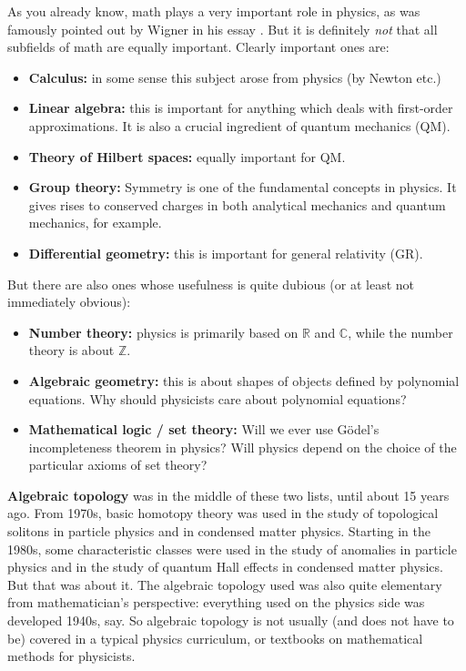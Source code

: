 \documentclass[12pt]{article}
\numberwithin{equation}{section}
\theoremstyle{remark}
\def\bC{\mathbb{C}}
\def\bR{\mathbb{R}}
\def\bZ{\mathbb{Z}}
\begin{document}
As you already know, math plays a very important role in physics, 
as was famously pointed out by Wigner in his essay \cite{WignerUnreasonable}.
But it is definitely \emph{not} that all subfields of math are equally important.
Clearly important ones are:
\begin{itemize}
  \item \textbf{Calculus:} in some sense this subject arose from physics (by Newton etc.)
  \item \textbf{Linear algebra:} this is important for anything which deals with first-order approximations. 
  It is also a crucial ingredient of quantum mechanics (QM).
  \item \textbf{Theory of Hilbert spaces:} equally important for QM.
  \item \textbf{Group theory:} Symmetry is one of the fundamental concepts in physics. It gives rises to conserved charges in both analytical mechanics and quantum mechanics, for example.
  \item \textbf{Differential geometry:} this is important for general relativity (GR).
\end{itemize}

But there are also ones whose usefulness is quite dubious (or at least not immediately obvious):
\begin{itemize}
  \item \textbf{Number theory:} physics is primarily based on $\bR$ and $\bC$, 
  while the number theory is about $\bZ$.
  \item \textbf{Algebraic geometry:} this is about shapes of objects defined by polynomial equations. 
  Why should physicists care about polynomial equations?
  \item \textbf{Mathematical logic / set theory:} Will we ever use G\"odel's incompleteness theorem in physics?
  Will physics depend on the choice of the particular axioms of set theory?
\end{itemize}

\textbf{Algebraic topology} was in the middle of these two lists, until about 15 years ago.
From 1970s, basic homotopy theory was used in the study of topological solitons 
in particle physics and in condensed matter physics.
Starting in the 1980s, 
some characteristic classes were used in the study of anomalies in particle physics
and in the study of quantum Hall effects in condensed matter physics.
But that was about it.
The algebraic topology used was also quite elementary from mathematician's perspective:
everything used on the physics side was developed 1940s, say.
So  algebraic topology is not usually (and does not have to be) covered in a typical physics curriculum,
or textbooks on mathematical methods for physicists.
\end{document}
